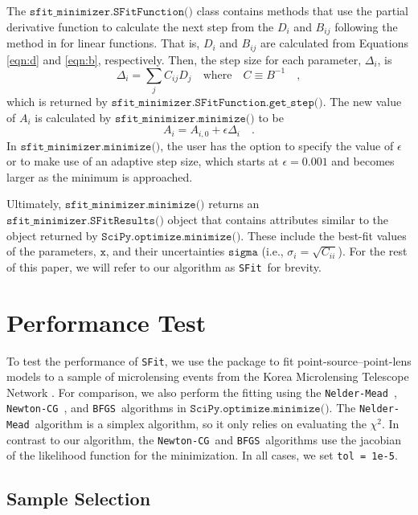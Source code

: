 \documentclass[preprint]{aastex631}
\newcommand{\minimize}{$\texttt{SciPy.optimize.minimize()}$}
\newcommand{\neldermead}{\texttt{Nelder-Mead}}
\newcommand{\newtoncg}{\texttt{Newton-CG}}
\newcommand{\bfgs}{\texttt{BFGS}}
\newcommand{\sfit}{\texttt{SFit}}
\begin{document}
The $\texttt{sfit\_minimizer.SFitFunction()}$ class contains methods that use the partial derivative function to calculate the next step from the $D_i$ and $B_{ij}$ following the method in \citet{Gould03} for linear functions. That is, $D_i$ and $B_{ij}$ are calculated from Equations \ref{eqn:d} and \ref{eqn:b}, respectively. Then, the step size for each parameter, $\Delta_i$, is
\begin{equation}
\Delta_i = \sum_j C_{ij} D_j \quad \mathrm{where} \quad C \equiv B^{-1} \quad,
\end{equation}
which is returned by $\texttt{sfit\_minimizer.SFitFunction.get\_step()}$.
The new value of $A_i$ is calculated by $\texttt{sfit\_minimizer.minimize()}$ to be
\begin{equation}
A_i = A_{i, 0} + \epsilon \Delta_i \quad . 
\end{equation}
In  $\texttt{sfit\_minimizer.minimize()}$, the user has the option to specify the value of $\epsilon$ or to make use of an adaptive step size, which starts at $\epsilon = 0.001$ and becomes larger as the minimum is approached.

Ultimately, $\texttt{sfit\_minimizer.minimize()}$ returns an $\texttt{sfit\_minimizer.SFitResults()}$ object that contains attributes similar to the object returned by \minimize. These include the best-fit values of the parameters, $\texttt{x}$, and their uncertainties $\texttt{sigma}$ (i.e., $\sigma_i = \sqrt{C_{ii}}$). For the rest of this paper, we will refer to our algorithm as \sfit\, for brevity.


\section{Performance Test}

To test the performance of \sfit, we use the package to fit point-source--point-lens models \citep{Paczynski86b} to a sample of microlensing events from the Korea Microlensing Telescope Network \citep[KMTNet;][]{Kim16_KMTNet}. For comparison, we also perform the fitting using the \neldermead\, \citep{NelderMead}, \newtoncg\, \citep{QuasiNewtonMethods}, and \bfgs\, \citep{QuasiNewtonMethods} algorithms in \minimize. The \neldermead\, algorithm is a simplex algorithm, so it only relies on evaluating the $\chi^2$. In contrast to our algorithm, the \newtoncg\, and \bfgs\, algorithms use the jacobian of the likelihood function for the minimization. In all cases, we set \texttt{tol = 1e-5}.

\subsection{Sample Selection}
\end{document}
